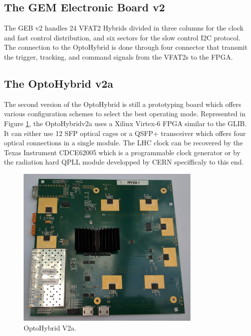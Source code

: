     \subsection{The GEM Electronic Board v2}

      The GEB v2 handles 24 VFAT2 Hybrids divided in three columns for the clock and fast control distribution, and six sectors for the slow control I2C protocol. The connection to the OptoHybrid is done through four connector that transmit the trigger, tracking, and command signals from the VFAT2s to the FPGA.

    \subsection{The OptoHybrid v2a}

      The second version of the OptoHybrid is still a prototyping board which offers various configuration schemes to select the best operating mode. Represented in Figure \ref{fig:II-2-ohv2a}, the OptoHybridv2a uses a Xilinx Virtex-6 FPGA similar to the GLIB. It can either use 12 SFP optical cages or a QSFP+ transceiver which offers four optical connections in a single module. The LHC clock can be recovered by the Texas Instrument CDCE62005 which is a programmable clock generator or by the radiation hard QPLL module developped by CERN specifficaly to this end.

      \begin{figure}[h!]
        \centering
        \includegraphics[width=0.8\textwidth]{img/II-2-daq/oh-v2a.jpg}
        \caption{OptoHybrid V2a.}
        \label{fig:II-2-ohv2a}
      \end{figure}

